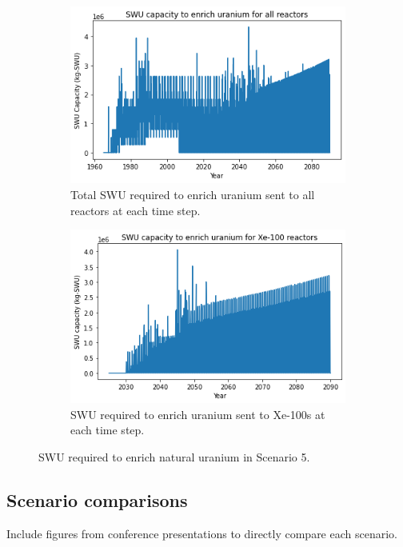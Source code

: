\begin{figure}
    \centering
    \begin{subfigure}{0.5\textwidth}
        \centering
        \includegraphics[scale=0.5]{../figures/totalswu_scenarios_5.png}
        \caption{Total \gls{SWU} required to enrich uranium sent to all reactors at each time step.}
        \label{fig:totalswu_5}
    \end{subfigure}
    \hspace{0.8cm}
    \begin{subfigure}{0.5\textwidth}
        \centering
        \includegraphics[scale=0.5]{../figures/haleuSWU_scenarios_5.png}
        \caption{\gls{SWU} required to enrich uranium sent to Xe-100s at each time step.}
        \label{fig:haleuswu_5}
    \end{subfigure}
    \caption{\gls{SWU} required to enrich natural uranium in Scenario 5.}
    \label{fig:swu_5}
\end{figure}

\subsection{Scenario comparisons}
Include figures from conference presentations to directly compare each 
scenario. 
